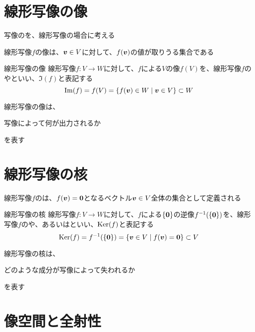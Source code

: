 \documentclass[../../../topic_linear-algebra]{subfiles}
\begin{document}
\sectionline
\section{線形写像の像}

写像のを、線形写像の場合に考える

線形写像$f$の像は、$\vb*{v} \in V$に対して、$f(\vb*{v})$の値が取りうる集合である

\begin{definition}{線形写像の像}
  線形写像$f\colon V \to W$に対して、$f$による$V$の像$f(V)$を、線形写像$f$のやといい、$\Im(f)$と表記する
  \begin{equation*}
    \Im(f) = f(V) = \{ f(\vb*{v}) \in W \mid \vb*{v} \in V \} \subset W
  \end{equation*}
\end{definition}

線形写像の像は、
\begin{shaded}
  写像によって何が出力されるか
\end{shaded}
を表す

\sectionline
\section{線形写像の核}

線形写像$f$のは、$f(\vb*{v}) = \vb*{0}$となるベクトル$\vb*{v} \in V$全体の集合として定義される

\begin{definition}{線形写像の核}
  線形写像$f\colon V \to W$に対して、$f$による$\{\vb*{0}\}$の逆像$f^{-1}(\{\vb*{0}\})$を、線形写像$f$のや、あるいはといい、$\operatorname{Ker}(f)$と表記する
  \begin{equation*}
    \operatorname{Ker}(f) = f^{-1}(\{\vb*{0}\}) = \{ \vb*{v} \in V \mid f(\vb*{v}) = \vb*{0} \} \subset V
  \end{equation*}
\end{definition}

線形写像の核は、
\begin{shaded}
  どのような成分が写像によって失われるか
\end{shaded}
を表す

\sectionline
\section{像空間と全射性}\label{sec:image-and-surjectivity}
\end{document}

